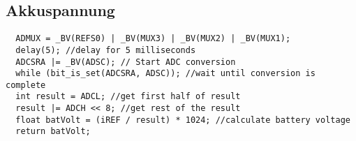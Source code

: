 \subsection{Akkuspannung}
\label{satelit spannung}
\begin{verbatim}
  ADMUX = _BV(REFS0) | _BV(MUX3) | _BV(MUX2) | _BV(MUX1);
  delay(5); //delay for 5 milliseconds
  ADCSRA |= _BV(ADSC); // Start ADC conversion
  while (bit_is_set(ADCSRA, ADSC)); //wait until conversion is complete
  int result = ADCL; //get first half of result
  result |= ADCH << 8; //get rest of the result
  float batVolt = (iREF / result) * 1024; //calculate battery voltage
  return batVolt;
\end{verbatim}